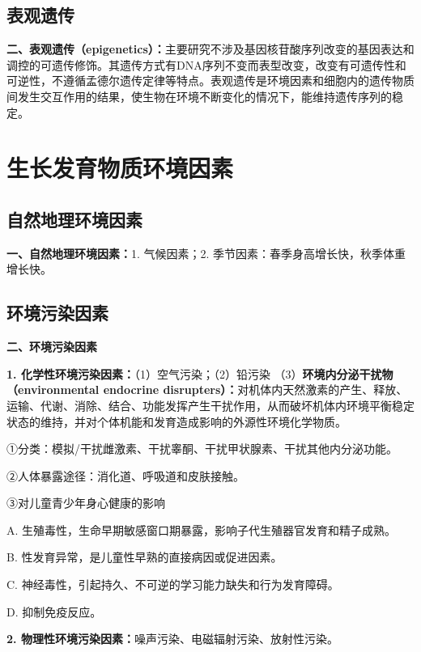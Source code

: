 \subsection{表观遗传}

\begin{keybox}
\textbf{二、表观遗传（epigenetics）：}主要研究不涉及基因核苷酸序列改变的基因表达和调控的可遗传修饰。其遗传方式有DNA序列不变而表型改变，改变有可遗传性和可逆性，不遵循孟德尔遗传定律等特点。表观遗传是环境因素和细胞内的遗传物质间发生交互作用的结果，使生物在环境不断变化的情况下，能维持遗传序列的稳定。
\end{keybox}

\section{生长发育物质环境因素}

\subsection{自然地理环境因素}

\begin{keybox}
\textbf{一、自然地理环境因素：}1. 气候因素；2. 季节因素：春季身高增长快，秋季体重增长快。
\end{keybox}

\subsection{环境污染因素}

\begin{keybox}
\textbf{二、环境污染因素}

\textbf{1. 化学性环境污染因素：}（1）空气污染；（2）铅污染
（3）\textbf{环境内分泌干扰物（environmental endocrine disrupters）：}对机体内天然激素的产生、释放、运输、代谢、消除、结合、功能发挥产生干扰作用，从而破坏机体内环境平衡稳定状态的维持，并对个体机能和发育造成影响的外源性环境化学物质。

①分类：模拟/干扰雌激素、干扰睾酮、干扰甲状腺素、干扰其他内分泌功能。

②人体暴露途径：消化道、呼吸道和皮肤接触。

③对儿童青少年身心健康的影响

A. 生殖毒性，生命早期敏感窗口期暴露，影响子代生殖器官发育和精子成熟。

B. 性发育异常，是儿童性早熟的直接病因或促进因素。

C. 神经毒性，引起持久、不可逆的学习能力缺失和行为发育障碍。

D. 抑制免疫反应。

\textbf{2. 物理性环境污染因素：}噪声污染、电磁辐射污染、放射性污染。
\end{keybox}

